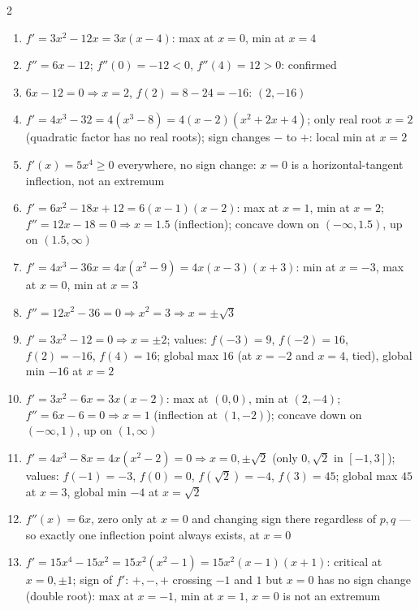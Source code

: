 \documentclass[11pt]{article}
\begin{document}
\begin{keybox}
\begin{multicols}{2}
\small
\begin{enumerate}[leftmargin=*,itemsep=3pt]
  \item $f'=3x^2-12x=3x(x-4)$: max at $x=0$, min at $x=4$
  \item $f''=6x-12$; $f''(0)=-12<0$, $f''(4)=12>0$: confirmed
  \item $6x-12=0\Rightarrow x=2$, $f(2)=8-24=-16$: $(2,-16)$
  \item $f'=4x^3-32=4(x^3-8)=4(x-2)(x^2+2x+4)$; only real root $x=2$ (quadratic factor has no real roots); sign changes $-$ to $+$: local min at $x=2$
  \item $f'(x)=5x^4\geq0$ everywhere, no sign change: $x=0$ is a horizontal-tangent inflection, not an extremum
  \item $f'=6x^2-18x+12=6(x-1)(x-2)$: max at $x=1$, min at $x=2$; $f''=12x-18=0\Rightarrow x=1.5$ (inflection); concave down on $(-\infty,1.5)$, up on $(1.5,\infty)$
  \item $f'=4x^3-36x=4x(x^2-9)=4x(x-3)(x+3)$: min at $x=-3$, max at $x=0$, min at $x=3$
  \item $f''=12x^2-36=0\Rightarrow x^2=3\Rightarrow x=\pm\sqrt3$
  \item $f'=3x^2-12=0\Rightarrow x=\pm2$; values: $f(-3)=9$, $f(-2)=16$, $f(2)=-16$, $f(4)=16$; global max $16$ (at $x=-2$ and $x=4$, tied), global min $-16$ at $x=2$
  \item $f'=3x^2-6x=3x(x-2)$: max at $(0,0)$, min at $(2,-4)$; $f''=6x-6=0\Rightarrow x=1$ (inflection at $(1,-2)$); concave down on $(-\infty,1)$, up on $(1,\infty)$
  \item $f'=4x^3-8x=4x(x^2-2)=0\Rightarrow x=0,\pm\sqrt2$ (only $0,\sqrt2$ in $[-1,3]$); values: $f(-1)=-3$, $f(0)=0$, $f(\sqrt2)=-4$, $f(3)=45$; global max $45$ at $x=3$, global min $-4$ at $x=\sqrt2$
  \item $f''(x)=6x$, zero only at $x=0$ and changing sign there regardless of $p,q$ --- so exactly one inflection point always exists, at $x=0$
  \item $f'=15x^4-15x^2=15x^2(x^2-1)=15x^2(x-1)(x+1)$: critical at $x=0,\pm1$; sign of $f'$: $+,-,+$ crossing $-1$ and $1$ but $x=0$ has no sign change (double root): max at $x=-1$, min at $x=1$, $x=0$ is not an extremum
\end{enumerate}
\end{multicols}
\end{keybox}
\end{document}
